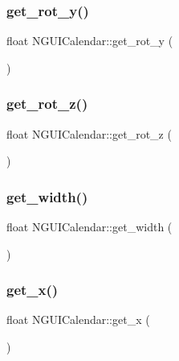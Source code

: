 \subsubsection{\texorpdfstring{get\+\_\+rot\+\_\+y()}{get\_rot\_y()}}
{\footnotesize\ttfamily float N\+G\+U\+I\+Calendar\+::get\+\_\+rot\+\_\+y (\begin{DoxyParamCaption}{ }\end{DoxyParamCaption})}

\hypertarget{class_n_g_u_i_calendar_a2943ef3e991dc64dc0a3c7df55f4163d}{}\label{class_n_g_u_i_calendar_a2943ef3e991dc64dc0a3c7df55f4163d} 
\subsubsection{\texorpdfstring{get\+\_\+rot\+\_\+z()}{get\_rot\_z()}}
{\footnotesize\ttfamily float N\+G\+U\+I\+Calendar\+::get\+\_\+rot\+\_\+z (\begin{DoxyParamCaption}{ }\end{DoxyParamCaption})}

\hypertarget{class_n_g_u_i_calendar_ac9addab46ccccb98ecfbb15f841b5379}{}\label{class_n_g_u_i_calendar_ac9addab46ccccb98ecfbb15f841b5379} 
\subsubsection{\texorpdfstring{get\+\_\+width()}{get\_width()}}
{\footnotesize\ttfamily float N\+G\+U\+I\+Calendar\+::get\+\_\+width (\begin{DoxyParamCaption}{ }\end{DoxyParamCaption})}

\hypertarget{class_n_g_u_i_calendar_a556619834b80ed1b2128b38eb8351e5e}{}\label{class_n_g_u_i_calendar_a556619834b80ed1b2128b38eb8351e5e} 
\subsubsection{\texorpdfstring{get\+\_\+x()}{get\_x()}}
{\footnotesize\ttfamily float N\+G\+U\+I\+Calendar\+::get\+\_\+x (\begin{DoxyParamCaption}{ }\end{DoxyParamCaption})}

